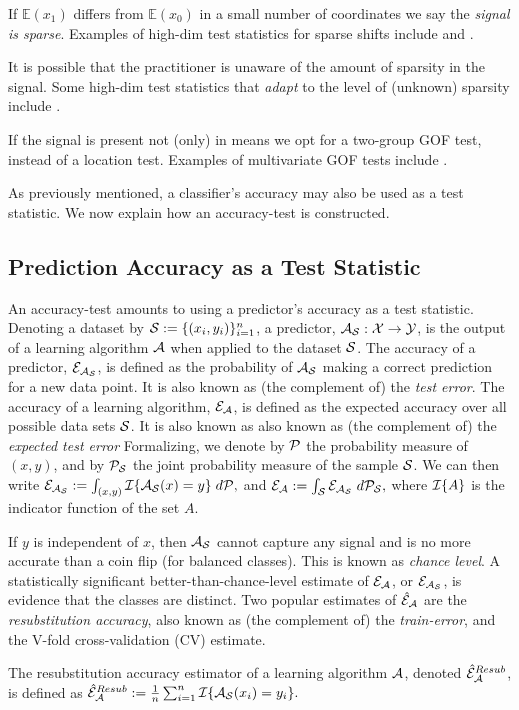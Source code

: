 \documentclass[]{bio}
\begin{document}
If $\mathbb{E}(x_1)$ differs from $\mathbb{E}(x_0)$ in a small number of coordinates we say the \emph{signal is sparse}.
Examples of high-dim test statistics for sparse shifts include \cite{cai_two-sample_2013} and \cite{chang2014simulation}.

It is possible that the practitioner is unaware of the amount of sparsity in the signal. 
Some high-dim test statistics that \emph{adapt} to the level of (unknown) sparsity include \cite{simes1986improved,donoho2004higher,zhong2013tests,shen2015adaptive,moscovich2016exact}.

If the signal is present not (only) in means we opt for a two-group GOF test, instead of a location test. 
Examples of multivariate GOF tests include \cite{bickel1969distribution,friedman1979multivariate,hall2002permutation,szekely2004testing,Biau2005,Rosenbaum2005,eric2008testing,perez2009estimation,vayatis_auc_2009,gretton_kernel_2012-1}.

As previously mentioned, a classifier's accuracy may also be used as a test statistic. 
We now explain how an accuracy-test is constructed. 


\subsection{Prediction Accuracy as a Test Statistic}
An accuracy-test amounts to using a predictor's accuracy as a test statistic.  
Denoting a dataset by $\mathcal{S}:=\{(x_i,y_i)\}_{i=1}^n$, a predictor, $\mathcal{A}_{\mathcal{S}}:\mathcal{X} \to \mathcal{Y}$, is the output of a learning algorithm $\mathcal{A}$ when applied to the dataset $\mathcal{S}$. 
The accuracy of a predictor, $\mathcal{E}_{\mathcal{A}_{\mathcal{S}}}$, is defined as the probability of $\mathcal{A}_{\mathcal{S}}$ making a correct prediction for a new data point. 
It is also known as (the complement of) the \emph{test error}.
The accuracy of a learning algorithm, $\mathcal{E}_{\mathcal{A}}$, is defined as the expected accuracy over all possible data sets $\mathcal{S}$. 
It is also known as also known as (the complement of) the \emph{expected test error}
Formalizing, we denote by $\mathcal{P}$ the probability measure of $(x, y)$, and by $\mathcal{P}_{\mathcal{S}}$ the joint probability measure of the sample $\mathcal{S}$. 
We can then write $\mathcal{E}_{\mathcal{A}_{\mathcal{S}}}:=\int_{(x,y)} \mathcal{I}{\{ \mathcal{A}_{\mathcal{S}}(x)=y \}} \; d\mathcal{P},$
and
$\mathcal{E}_{\mathcal{A}}:=\int_{\mathcal{S}} \mathcal{E}_{\mathcal{A}_{\mathcal{S}}} \; d\mathcal{P}_{\mathcal{S}},$
where $\mathcal{I}{\{ A \}}$ is the indicator function of the set $A$. 

If $y$ is independent of $x$, then $\mathcal{A}_{\mathcal{S}}$ cannot capture any signal and is no more accurate than a coin flip (for balanced classes). 
This is known as \emph{chance level}.
A statistically significant better-than-chance-level estimate of $\mathcal{E}_{\mathcal{A}}$, or $\mathcal{E}_{\mathcal{A}_{\mathcal{S}}}$, is evidence that the classes are distinct. 
Two popular estimates of $\hat{\mathcal{E}}_{\mathcal{A}}$ are the \emph{resubstitution accuracy}, also known as (the complement of) the \emph{train-error}, and the V-fold cross-validation (CV) estimate.
\begin{definition}
	\label{def:resubstitution}
	The resubstitution accuracy estimator of a learning algorithm $\mathcal{A}$, denoted $\hat{\mathcal{E}}_{\mathcal{A}}^{Resub}$,  is defined as
	$\hat{\mathcal{E}}_{\mathcal{A}}^{Resub} := \frac 1n \sum_{i=1}^{n} \mathcal{I}{\{ \mathcal{A}_{\mathcal{S}}(x_i)=y_i \}}.$
\end{definition}
\end{document}
